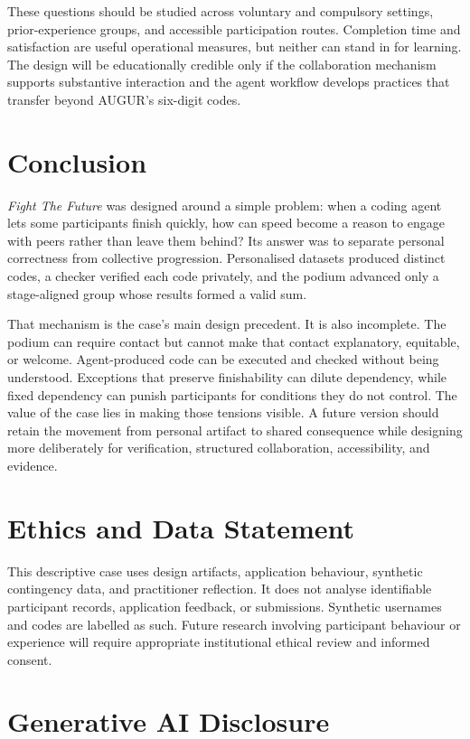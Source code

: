 \documentclass[11pt,a4paper]{article}
\begin{document}
These questions should be studied across voluntary and compulsory settings, prior-experience groups, and accessible participation routes. Completion time and satisfaction are useful operational measures, but neither can stand in for learning. The design will be educationally credible only if the collaboration mechanism supports substantive interaction and the agent workflow develops practices that transfer beyond AUGUR's six-digit codes.

\section{Conclusion}

\emph{Fight The Future} was designed around a simple problem: when a coding agent lets some participants finish quickly, how can speed become a reason to engage with peers rather than leave them behind? Its answer was to separate personal correctness from collective progression. Personalised datasets produced distinct codes, a checker verified each code privately, and the podium advanced only a stage-aligned group whose results formed a valid sum.

That mechanism is the case's main design precedent. It is also incomplete. The podium can require contact but cannot make that contact explanatory, equitable, or welcome. Agent-produced code can be executed and checked without being understood. Exceptions that preserve finishability can dilute dependency, while fixed dependency can punish participants for conditions they do not control. The value of the case lies in making those tensions visible. A future version should retain the movement from personal artifact to shared consequence while designing more deliberately for verification, structured collaboration, accessibility, and evidence.

\section*{Ethics and Data Statement}

This descriptive case uses design artifacts, application behaviour, synthetic contingency data, and practitioner reflection. It does not analyse identifiable participant records, application feedback, or submissions. Synthetic usernames and codes are labelled as such. Future research involving participant behaviour or experience will require appropriate institutional ethical review and informed consent.

\section*{Generative AI Disclosure}
\end{document}
